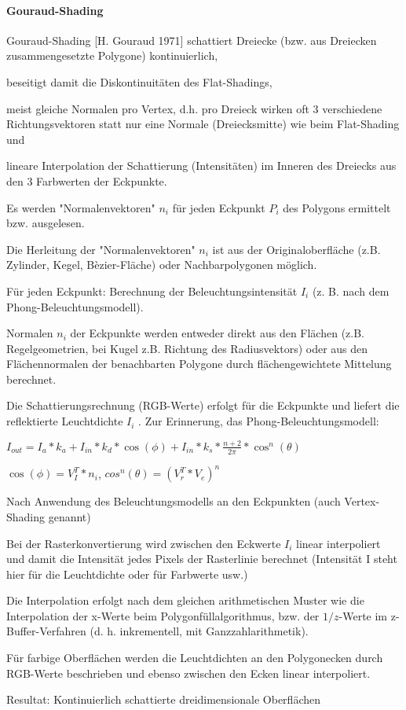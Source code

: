 \documentclass[landscape]{article}
\begin{document}
\begin{multicols}{3}
  \paragraph{Gouraud-Shading}
  \begin{itemize*}
    \item Gouraud-Shading [H. Gouraud 1971] schattiert Dreiecke (bzw. aus Dreiecken zusammengesetzte Polygone) kontinuierlich,
    \item beseitigt damit die Diskontinuitäten des Flat-Shadings,
    \item meist gleiche Normalen pro Vertex, d.h. pro Dreieck wirken oft 3 verschiedene Richtungsvektoren statt nur eine Normale (Dreiecksmitte) wie beim Flat-Shading und
    \item lineare Interpolation der Schattierung (Intensitäten) im Inneren des Dreiecks aus den 3 Farbwerten der Eckpunkte.
    \item Es werden "Normalenvektoren" $n_i$ für jeden Eckpunkt $P_i$ des Polygons ermittelt bzw. ausgelesen.
    \item Die Herleitung der "Normalenvektoren" $n_i$ ist aus der Originaloberfläche (z.B. Zylinder, Kegel, Bèzier-Fläche) oder Nachbarpolygonen möglich.
    \item Für jeden Eckpunkt: Berechnung der Beleuchtungsintensität $I_i$ (z. B. nach dem Phong-Beleuchtungsmodell).
    \item Normalen $n_i$ der Eckpunkte werden entweder direkt aus den Flächen (z.B. Regelgeometrien, bei Kugel z.B. Richtung des Radiusvektors) oder aus den Flächennormalen der benachbarten Polygone durch flächengewichtete Mittelung berechnet.
    \item Die Schattierungsrechnung (RGB-Werte) erfolgt für die Eckpunkte und liefert die reflektierte Leuchtdichte $I_i$ . Zur Erinnerung, das Phong-Beleuchtungsmodell:
    \item $I_{out}=I_a*k_a+I_{in}*k_d*\cos(\phi)+I_{in}*k_s*\frac{n+2}{2\pi}*\cos^n(\theta)$
    \item $\cos(\phi)=V^T_I*n_i$, $cos^n(\theta)=(V^T_r * V_e)^n$
    \item Nach Anwendung des Beleuchtungsmodells an den Eckpunkten (auch Vertex-Shading genannt)
    \item Bei der Rasterkonvertierung wird zwischen den Eckwerte $I_i$ linear interpoliert und damit die Intensität jedes Pixels der Rasterlinie berechnet (Intensität I steht hier für die Leuchtdichte oder für Farbwerte usw.)
    \item Die Interpolation erfolgt nach dem gleichen arithmetischen Muster wie die Interpolation der x-Werte beim Polygonfüllalgorithmus, bzw. der $1/z$-Werte im z-Buffer-Verfahren (d. h. inkrementell, mit Ganzzahlarithmetik).
    \item Für farbige Oberflächen werden die Leuchtdichten an den Polygonecken durch RGB-Werte beschrieben und ebenso zwischen den Ecken linear interpoliert.
    \item Resultat: Kontinuierlich schattierte dreidimensionale Oberflächen
  \end{itemize*}
  

\end{multicols}
\end{document}
